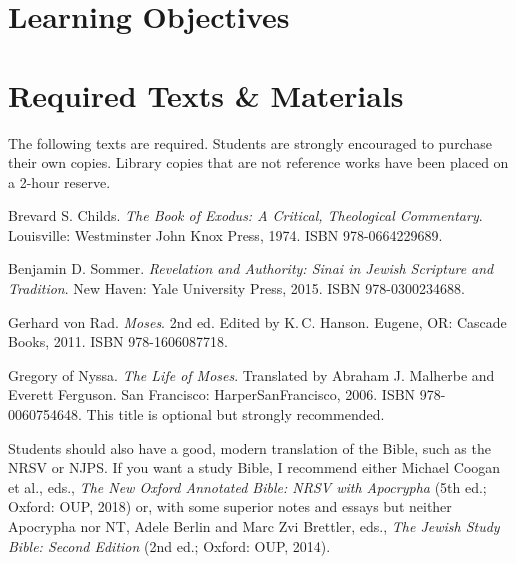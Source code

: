 \documentclass[titlepage]{article}
\newcommand\incl{../includes}
\begin{document}


\section{Learning Objectives}
\label{objectives}

\edobject

\section{Required Texts \& Materials}
\label{texts}

The following texts are required. Students are strongly encouraged to
purchase their own copies. Library copies that are not reference works
have been placed on a 2-hour reserve.

\begingroup
\renewcommand{\section}[2]{}%
\begin{thebibliography}{Sommer}%


	 Brevard S. Childs.
	\emph{The Book of Exodus: A Critical, Theological Commentary}.
	Louisville: Westminster John Knox Press, 1974.
	ISBN 978-0664229689.

	 Benjamin D. Sommer.
	\emph{Revelation and Authority: Sinai in Jewish Scripture and Tradition}.
	New Haven: Yale University Press, 2015.
	ISBN 978-0300234688.

	 Gerhard von Rad.
	\emph{Moses}. 2nd ed. Edited by K.\,C. Hanson.
	Eugene, OR: Cascade Books, 2011.
	ISBN 978-1606087718.

	 Gregory of Nyssa.
	\emph{The Life of Moses}. Translated by Abraham J. Malherbe and Everett Ferguson.
	San Francisco: HarperSanFrancisco, 2006.
	ISBN 978-0060754648. This title is optional but strongly recommended.

\end{thebibliography}
\endgroup

Students should also have a good, modern translation of the Bible, such
as the NRSV or NJPS. If you want a study Bible, I recommend either
Michael Coogan et al., eds., \emph{The New Oxford Annotated Bible: NRSV
with Apocrypha} (5th ed.; Oxford: OUP, 2018) or, with some superior
notes and essays but neither Apocrypha nor NT, Adele Berlin and Marc Zvi
Brettler, eds., \emph{The Jewish Study Bible: Second Edition} (2nd ed.;
Oxford: OUP, 2014).
\end{document}
